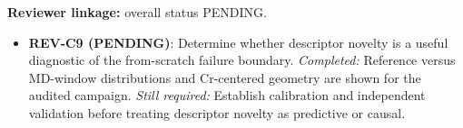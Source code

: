 \textbf{Reviewer linkage:} overall status PENDING.
\begin{itemize}[leftmargin=1.4em,noitemsep]
\item \textbf{REV-C9 (PENDING)}: Determine whether descriptor novelty is a useful diagnostic of the from-scratch failure boundary. \emph{Completed:} Reference versus MD-window distributions and Cr-centered geometry are shown for the audited campaign. \emph{Still required:} Establish calibration and independent validation before treating descriptor novelty as predictive or causal.
\end{itemize}
